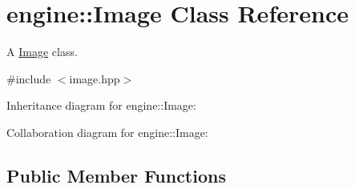 \hypertarget{classengine_1_1_image}{}\section{engine\+:\+:Image Class Reference}
\label{classengine_1_1_image}


A \hyperlink{classengine_1_1_image}{Image} class.  




{\ttfamily \#include $<$image.\+hpp$>$}



Inheritance diagram for engine\+:\+:Image\+:


Collaboration diagram for engine\+:\+:Image\+:
\subsection*{Public Member Functions}
